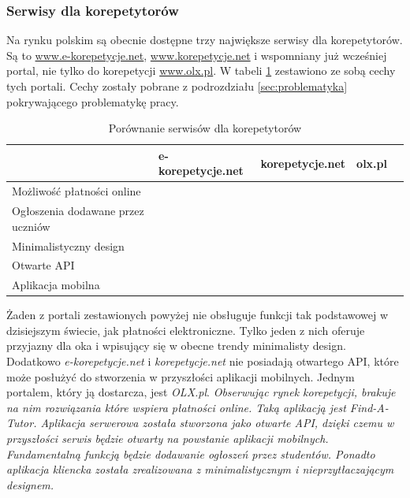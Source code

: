 \documentclass[12pt]{article}
\newcommand{\cmark}{\textcolor{green!80!black}{\ding{51}}}
\newcommand{\xmark}{\textcolor{red}{\ding{55}}}
\numberwithin{figure}{section}
\begin{document}
\begin{sloppypar}
\subsubsection{Serwisy dla korepetytorów}
Na rynku polskim są obecnie dostępne trzy największe serwisy dla korepetytorów. Są to \url{www.e-korepetycje.net}, \url{www.korepetycje.net} i wspomniany już wcześniej portal, nie tylko do korepetycji \url{www.olx.pl}. W tabeli \ref{tab:korepetycje} zestawiono ze sobą cechy tych portali. Cechy zostały pobrane z podrozdziału \ref{sec:problematyka} pokrywającego problematykę pracy.

\begin{table}[htbp]
    \begin{tabular}{|p{4cm}|c|c|c|c|}
    \hline
     & \multicolumn{1}{l|}{\textbf{e-korepetycje.net}} & \multicolumn{1}{l|}{\textbf{korepetycje.net}} & \multicolumn{1}{l|}{\textbf{olx.pl}} \\ \hline
    Możliwość płatności online & \xmark & \xmark & \xmark \\ \hline
    Ogłoszenia dodawane przez uczniów & \cmark & \xmark & \cmark \\ \hline
    Minimalistyczny design & \cmark & \xmark & \xmark \\ \hline
    Otwarte API & \xmark & \xmark & \xmark \\ \hline
    Aplikacja mobilna & \xmark & \xmark & \cmark \\ \hline
    \end{tabular}
    \caption{Porównanie serwisów dla korepetytorów}
    \label{tab:korepetycje}
\end{table}

Żaden z portali zestawionych powyżej nie obsługuje funkcji tak podstawowej w dzisiejszym świecie, jak płatności elektroniczne. Tylko jeden z nich oferuje przyjazny dla oka i wpisujący się w obecne trendy minimalisty design. Dodatkowo \textit{e-korepetycje.net} i \textit{korepetycje.net} nie posiadają otwartego API, które może posłużyć do stworzenia w przyszłości aplikacji mobilnych. Jednym portalem, który ją dostarcza, jest \textit{OLX.pl}.
\newline
\newline
\indent
\textit{Obserwując rynek korepetycji, brakuje na nim rozwiązania które wspiera płatności online. Taką aplikacją jest Find-A-Tutor. Aplikacja serwerowa została stworzona jako otwarte API, dzięki czemu w przyszłości serwis będzie otwarty na powstanie aplikacji mobilnych. Fundamentalną funkcją będzie dodawanie ogłoszeń przez studentów. Ponadto aplikacja kliencka została zrealizowana z minimalistycznym i nieprzytłaczającym designem.}


\end{sloppypar}
\end{document}

